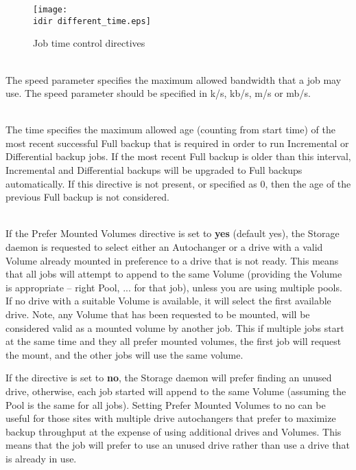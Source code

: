 \begin{description}
\begin{figure}[htbp]
  \centering
  \texttt{[image: \\idir different\_time.eps]}
  \caption{Job time control directives}
  \label{fig:differenttime}
\end{figure}

\item [Maximum Bandwidth = {\textless}speed{\textgreater}] \hfill \\
The speed parameter specifies the maximum allowed bandwidth that a job may
use. The speed parameter should be specified in k/s, kb/s, m/s or mb/s.

\item [Max Full Interval = {\textless}time{\textgreater}] \hfill \\
The time specifies the maximum allowed age (counting from start time) of
the most recent successful Full backup that is required in order to run
Incremental or Differential backup jobs. If the most recent Full backup
is older than this interval, Incremental and Differential backups will be
upgraded to Full backups automatically. If this directive is not present,
or specified as 0, then the age of the previous Full backup is not
considered.

\label{PreferMountedVolumes}
\item [Prefer Mounted Volumes = {\textless}yes{\textbar}no{\textgreater}] \hfill \\
If the Prefer Mounted Volumes directive is set to {\bf yes} (default
yes), the Storage daemon is requested to select either an Autochanger or
a drive with a valid Volume already mounted in preference to a drive
that is not ready.  This means that all jobs will attempt to append
to the same Volume (providing the Volume is appropriate -- right Pool,
... for that job), unless you are using multiple pools.
If no drive with a suitable Volume is available, it
will select the first available drive.  Note, any Volume that has
been requested to be mounted, will be considered valid as a mounted
volume by another job.  This if multiple jobs start at the same time
and they all prefer mounted volumes, the first job will request the
mount, and the other jobs will use the same volume.

If the directive is set to {\bf no}, the Storage daemon will prefer
finding an unused drive, otherwise, each job started will append to the
same Volume (assuming the Pool is the same for all jobs).  Setting
Prefer Mounted Volumes to no can be useful for those sites
with multiple drive autochangers that prefer to maximize backup
throughput at the expense of using additional drives and Volumes.
This means that the job will prefer to use an unused drive rather
than use a drive that is already in use.


\end{description}
